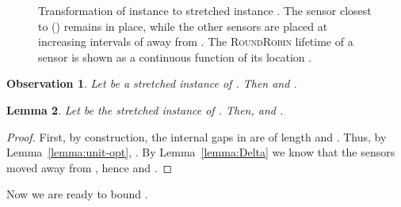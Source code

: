 \documentclass[11pt]{article}
\newtheorem{lemma}{Lemma}
\newtheorem{observation}[lemma]{Observation}
\newcommand{\rr}{\textsc{RoundRobin}\xspace}
\begin{document}
\begin{figure}[t]
{ }
\vspace{-5pt}
\caption{Transformation of instance  to stretched instance . The sensor closest to  () remains in place, while the other sensors are placed at increasing intervals of  away from . The \rr lifetime of a sensor is shown as a continuous function of its location .}
\label{fig:stretching}
\end{figure}
	




\begin{observation}
Let  be a stretched instance of .  Then  and .
\end{observation}


\begin{lemma}
\label{lemma:stretch}
Let  be the stretched instance of .  Then,  and .
\end{lemma}
\begin{proof}
First, by construction, the internal gaps in  are of length
 and .  Thus, by
Lemma~\ref{lemma:unit-opt}, .
By Lemma~\ref{lemma:Delta} we know that the sensors moved away from
, hence  and .
\end{proof}

Now we are ready to bound .
	
\end{document}
